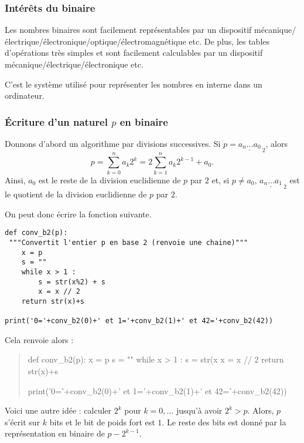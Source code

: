 \subsubsection{Intérêts du binaire}
Les nombres binaires sont facilement représentables par un dispositif
  mécanique/électrique/électronique/optique/électromagnétique etc.
De plus, les tables d'opérations très simples et sont facilement calculables par un
  dispositif mécanique/électrique/électronique etc.

C'est le système utilisé pour représenter les nombres en interne dans
un ordinateur.

\subsubsection{Écriture d'un naturel $p$ en binaire}

Donnons d'abord un algorithme par divisions successives.
Si $p = \underline{a_n\dots a_0}_{~2}$, alors 
$$ p = \sum_{k=0}^n a_k 2^k = 2\sum_{k=1}^n a_k2^{k-1} + a_0.$$
Ainsi, $a_0$ est le reste de la division euclidienne de $p$ par $2$ et, si $p\neq a_0$, $\underline{a_n\dots a_1}_{~2}$ est le quotient de la division euclidienne de $p$ par $2$.

On peut donc écrire la fonction suivante.



\begin{lstlisting}
def conv_b2(p):
 """Convertit l'entier p en base 2 (renvoie une chaine)"""
    x = p
    s = ""
    while x > 1 :
        s = str(x%2) + s
        x = x // 2
    return str(x)+s

print('0='+conv_b2(0)+' et 1='+conv_b2(1)+' et 42='+conv_b2(42))
\end{lstlisting}



Cela renvoie alors :
\begin{quote}
\begin{pycode}
def conv_b2(p):
    x = p
    s = ""
    while x > 1 :
        s = str(x%
        x = x // 2
    return str(x)+s

print('0='+conv_b2(0)+' et 1='+conv_b2(1)+' et 42='+conv_b2(42))
\end{pycode}
\end{quote}


Voici une autre idée : calculer $2^{k}$ pour $k=0, \ldots$ jusqu'à avoir $2^{k} >
  p$. Alors, $p$ s'écrit sur $k$ bits et le bit de poids fort est
  $1$. Le reste des bits est donné par la représentation en binaire de
  $p-2^{k-1}$.


